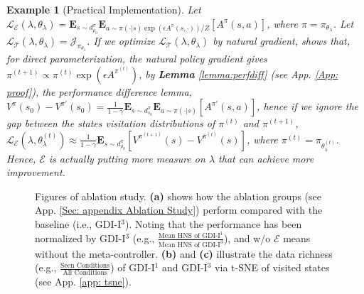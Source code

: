 \documentclass[nohyperref]{article}
\theoremstyle{plain}
\newtheorem{Example}{Example}
\begin{document}
\begin{Example}[Practical Implementation]
\label{example: GDI meta}
    Let $\mathcal{L}_{\mathcal{E}} (\lambda, \theta_{\lambda}) = \textbf{E}_{s \sim d_{\rho_0}^{\pi}} \textbf{E}_{a \sim \pi(\cdot | s) \exp(\epsilon A^{\pi}(s, \cdot))/Z} [A^{\pi}(s, a)]$, where $\pi = \pi_{\theta_{\lambda}}$.
    Let $\mathcal{L}_{\mathcal{T}} (\lambda, \theta_{\lambda}) = \mathcal{J}_{\pi_{\theta_{\lambda}}}$.
    If we optimize $\mathcal{L}_{\mathcal{T}} (\lambda, \theta_{\lambda})$ by natural gradient, 
    \citep{pgtheory} shows that, for direct parameterization, the natural policy gradient gives $\pi^{(t+1)} \propto \pi^{(t)} \exp (\epsilon A^{\pi^{(t)}})$, by \textbf{Lemma} \ref{lemma:perfdiff} (see App. \ref{App: proof}), the performance difference lemma,
    $V^{\pi} (s_0) - V^{\pi'} (s_0) = \frac{1}{1 - \gamma} \textbf{E}_{s \sim d_{s_0}^\pi} \textbf{E}_{a \sim \pi (\cdot | s)} [ A^{\pi'} (s, a) ]$, 
    hence if we ignore the gap between the states visitation distributions of $\pi^{(t)}$ and $\pi^{(t+1)}$, 
    $\mathcal{L}_{\mathcal{E}} (\lambda, \theta_{\lambda}^{(t)}) \approx \frac{1}{1 - \gamma} \textbf{E}_{s \sim d_{\rho_0}^{\pi}} [V^{\pi^{(t+1)}}(s) - V^{\pi^{(t)}} (s)]$, 
    where $\pi^{(t)} = \pi_{\theta_{\lambda}^{(t)}}$.
    Hence, $\mathcal{E}$ is actually putting more measure on $\lambda$ that can achieve more improvement.
\end{Example}



\begin{figure*}[!t]
\caption{Figures of ablation study. \textbf{(a)} shows  how   the ablation groups (see App. \ref{Sec: appendix Ablation Study}) perform compared with the baseline (i.e., GDI-I$^3$). Noting that the performance has been normalized by GDI-I$^3$ (e.g., $\frac{\text{Mean HNS of  GDI-I}^1}{\text{Mean HNS of GDI-I}^3}$), and w/o $\mathcal{E}$ means without the meta-controller. \textbf{(b)} and \textbf{(c)} illustrate the  data richness (e.g., $\frac{\text{Seen Conditions}}{\text{All Conditions}}$) of GDI-I$^1$ and GDI-I$^3$ via t-SNE  of visited states (see App. \ref{app: tsne}).}
\label{fig:ablation study}
\end{figure*}
\end{document}
